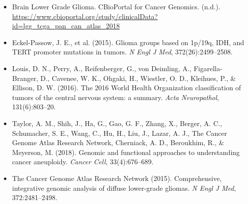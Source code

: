 \documentclass{beamer}
\begin{document}
\begin{frame}
\footnotesize
\begin{itemize}
    \item Brain Lower Grade Glioma. CBioPortal for Cancer Genomics. (n.d.). \url{https://www.cbioportal.org/study/clinicalData?id=lgg_tcga_pan_can_atlas_2018}
    \item Eckel-Passow, J. E., et al. (2015). Glioma groups based on 1p/19q, IDH, and TERT promoter mutations in tumors. \textit{N Engl J Med}, 372(26):2499--2508.
    \item Louis, D. N., Perry, A., Reifenberger, G., von Deimling, A., Figarella-Branger, D., Cavenee, W. K., Ohgaki, H., Wiestler, O. D., Kleihues, P., \& Ellison, D. W. (2016). The 2016 World Health Organization classification of tumors of the central nervous system: a summary. \textit{Acta Neuropathol}, 131(6):803--20. 
    \item Taylor, A. M., Shih, J., Ha, G., Gao, G. F., Zhang, X., Berger, A. C., Schumacher, S. E., Wang, C., Hu, H., Liu, J., Lazar, A. J., The Cancer Genome Atlas Research Network, Cherniack, A. D., Beroukhim, R., \& Meyerson, M. (2018). Genomic and functional approaches to understanding cancer aneuploidy. \textit{Cancer Cell}, 33(4):676--689.
    \item The Cancer Genome Atlas Research Network (2015). Comprehensive, integrative genomic analysis of diffuse lower-grade gliomas. \textit{N Engl J Med}, 372:2481--2498.
\end{itemize} 
\end{frame}
\end{document}
